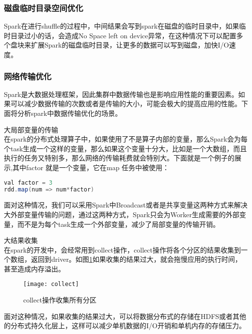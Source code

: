 \subsubsection{磁盘临时目录空间优化}
Spark在进行shuffle的过程中，中间结果会写到spark在磁盘的临时目录中，如果临时目录过小的话，会造成No Space left on device异常，在这种情况下可以配置多个盘块来扩展Spark的磁盘临时目录，让更多的数据可以写到磁盘，加快I/O速度。
\subsubsection{网络传输优化}
Spark是大数据处理框架，因此集群中数据传输也是影响应用性能的重要因素。如果可以减少数据传输的次数或者是传输的大小，可能会极大的提高应用的性能。下面将分析spark中数据传输优化的场景。
\begin{compactenum}
\item 大局部变量的传输\\在spark的分布式处理算子中，如果使用了不是算子内部的变量，那么Spark会为每个task生成一个这样的变量，那么如果这个变量十分大，比如是一个大数组，而且执行的任务又特别多，那么网络的传输耗费就会特别大。下面就是一个例子的展示,其中factor 就是一个变量，它在map 任务中被使用：
\begin{lstlisting}[language=Java,numbers=none,frame=none]
val factor = 3
rdd.map(num => num*factor)
\end{lstlisting}

面对这种情况，我们可以采用Spark中Broadcast或者是共享变量这两种方式来解决大外部变量传输的问题，通过这两种方式，Spark只会为Worker生成需要的外部变量，而不是为每个task生成一个外部变量，减少了局部变量的传输开销。
\item 大结果收集\\在spark的开发中，会经常用到collect操作，collect操作将各个分区的结果收集到一个数组，返回到driver。如图\ref{fig:collect}如果收集的结果过大，就会拖慢应用的执行时间，甚至造成内存溢出。
\begin{figure}[htp]
\centering
\texttt{[image: collect]}
\caption{collect操作收集所有分区}
\label{fig:collect}
\end{figure}
面对这种情况，如果收集的结果过大，可以将数据分布式的存储在HDFS或者其他的分布式持久化层上，这样可以减少单机数据的I/O开销和单机内存的存储压力。
\end{compactenum}
